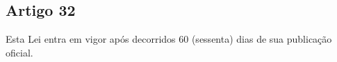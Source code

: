 \subsection{Artigo 32}
Esta Lei entra em vigor após decorridos 60 (sessenta) dias de sua publicação oficial.